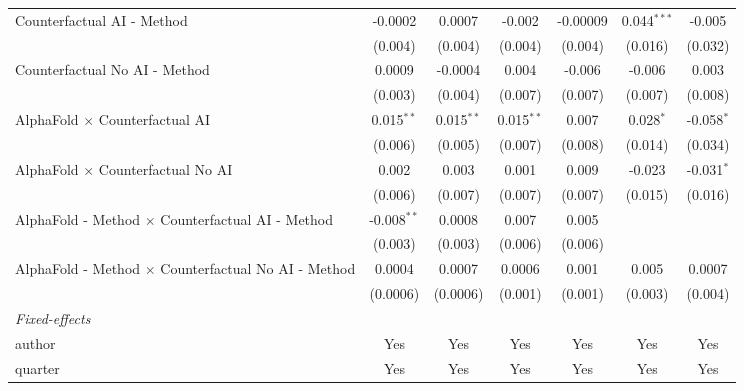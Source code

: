 \begin{tabular}{lcccccc}
   Counterfactual AI - Method                                 & -0.0002        & 0.0007         & -0.002       & -0.00009 & 0.044$^{***}$ & -0.005\\   
                                                              & (0.004)        & (0.004)        & (0.004)      & (0.004)  & (0.016)       & (0.032)\\   
   Counterfactual No AI - Method                              & 0.0009         & -0.0004        & 0.004        & -0.006   & -0.006        & 0.003\\   
                                                              & (0.003)        & (0.004)        & (0.007)      & (0.007)  & (0.007)       & (0.008)\\   
   AlphaFold $\times$ Counterfactual AI                       & 0.015$^{**}$   & 0.015$^{**}$   & 0.015$^{**}$ & 0.007    & 0.028$^{*}$   & -0.058$^{*}$\\   
                                                              & (0.006)        & (0.005)        & (0.007)      & (0.008)  & (0.014)       & (0.034)\\   
   AlphaFold $\times$ Counterfactual No AI                    & 0.002          & 0.003          & 0.001        & 0.009    & -0.023        & -0.031$^{*}$\\   
                                                              & (0.006)        & (0.007)        & (0.007)      & (0.007)  & (0.015)       & (0.016)\\   
   AlphaFold - Method $\times$ Counterfactual AI - Method     & -0.008$^{**}$  & 0.0008         & 0.007        & 0.005    &               &   \\   
                                                              & (0.003)        & (0.003)        & (0.006)      & (0.006)  &               &   \\   
   AlphaFold - Method $\times$ Counterfactual No AI - Method  & 0.0004         & 0.0007         & 0.0006       & 0.001    & 0.005         & 0.0007\\   
                                                              & (0.0006)       & (0.0006)       & (0.001)      & (0.001)  & (0.003)       & (0.004)\\   
   \midrule
   \emph{Fixed-effects}\\
   author                                                     & Yes            & Yes            & Yes          & Yes      & Yes           & Yes\\  
   quarter                                                    & Yes            & Yes            & Yes          & Yes      & Yes           & Yes\\  

\end{tabular}
